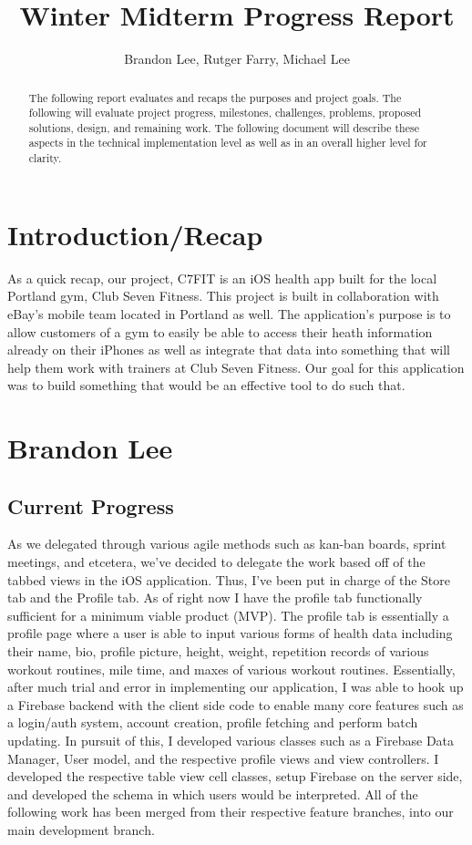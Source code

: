 \documentclass[a4paper]{article}
\title{Winter Midterm Progress Report}
\author{Brandon Lee, Rutger Farry, Michael Lee}
\begin{document}
\maketitle

\begin{abstract}
The following report evaluates and recaps the purposes and project goals. The following will evaluate project progress, milestones, challenges, problems, proposed solutions, design, and remaining work. The following document will describe these aspects in the technical implementation level as well as in an overall higher level for clarity.
\end{abstract}
\newpage

\section{Introduction/Recap}

As a quick recap, our project, C7FIT is an iOS health app built for the local Portland gym, Club Seven Fitness. This project is built in collaboration with eBay's mobile team located in Portland as well. The application's purpose is to allow customers of a gym to easily be able to access their heath information already on their iPhones as well as integrate that data into something that will help them work with trainers at Club Seven Fitness. Our goal for this application was to build something that would be an effective tool to do such that.

\section{Brandon Lee}

\subsection{Current Progress}

As we delegated through various agile methods such as kan-ban boards, sprint meetings, and etcetera, we've decided to delegate the work based off of the tabbed views in the iOS application. Thus, I've been put in charge of the Store tab and the Profile tab. As of right now I have the profile tab functionally sufficient for a minimum viable product (MVP).  The profile tab is essentially a profile page where a user is able to input various forms of health data including their name, bio, profile picture, height, weight, repetition records of various workout routines, mile time, and maxes of various workout routines. Essentially, after much trial and error in implementing our application, I was able to hook up a Firebase backend with the client side code to enable many core features such as a login/auth system, account creation, profile fetching and perform batch updating. In pursuit of this, I developed various classes such as a Firebase Data Manager, User model, and the respective profile views and view controllers. I developed the respective table view cell classes, setup Firebase on the server side, and developed the schema in which users would be interpreted. All of the following work has been merged from their respective feature branches, into our main development branch.
\end{document}
